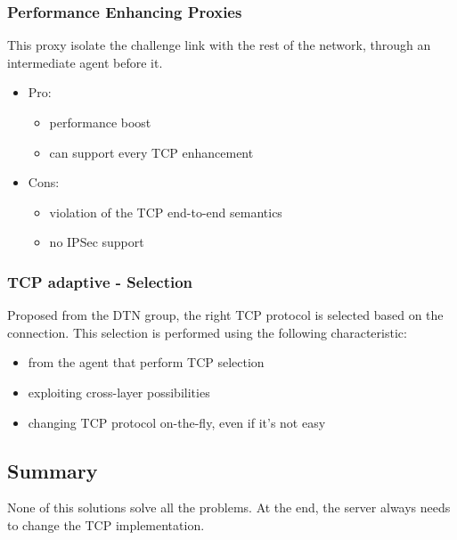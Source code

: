 \subsubsection{Performance Enhancing Proxies}
This proxy isolate the challenge link with the rest of the network, through an
intermediate agent before it.
\begin{itemize}
  \item Pro:
    \begin{itemize}
    \item performance boost
    \item can support every TCP enhancement
    \end{itemize}
  \item Cons:
    \begin{itemize}
    \item violation of the TCP end-to-end semantics
    \item no IPSec support
    \end{itemize}
\end{itemize}

\subsubsection{TCP adaptive - Selection}
Proposed from the DTN group, the right TCP protocol is selected based on the
connection. This selection is performed using the following characteristic:
\begin{itemize}
\item from the agent that perform TCP selection
\item exploiting cross-layer possibilities
\item changing TCP protocol on-the-fly, even if it's not easy
\end{itemize}

\subsection{Summary}
None of this solutions solve all the problems. At the end, the server always
needs to change the TCP implementation.
